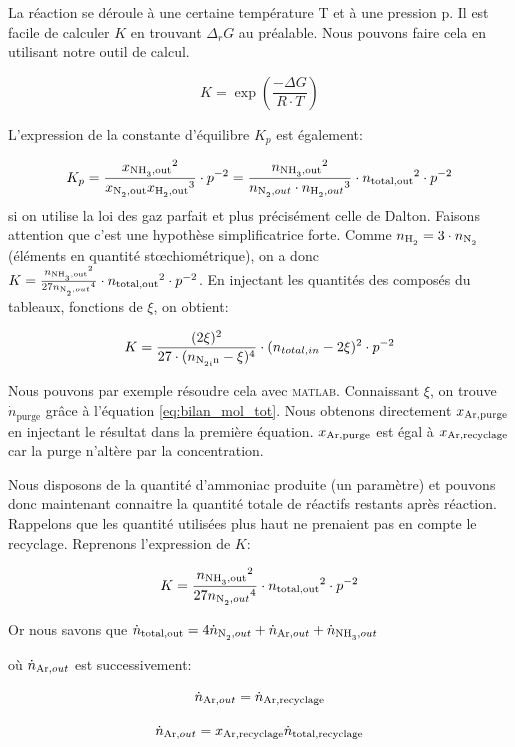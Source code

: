 \documentclass[a4paper, oneside, 12pt]{article}
\begin{document}
La réaction se déroule à une certaine température T et à une pression p. 
Il est facile de calculer $K$ en trouvant $\Delta_r G$ au préalable. 
Nous pouvons faire cela en utilisant notre outil de calcul.

\[
K=\exp{\left(\frac{-\Delta G}{R \cdot T}\right)}\]

L'expression de la constante d'équilibre $K_p$ est également: 

\[
K_p=\frac{{x_{\ce{NH3},\text{out}}}^2}{x_{\ce{N2},\text{out}}{x_{\ce{H2},\text{out}}}^3} \cdot p^{-2} = 
\frac{{n_{\ce{NH3},\text{out}}}^2}{n_{\ce{N2},out}\cdot {n_{\ce{H2},out}}^3}\cdot {n_{\text{total,out}}}^2\cdot p^{-2}
\]
si on utilise la loi des gaz parfait et plus précisément celle de Dalton. Faisons attention que c'est une hypothèse simplificatrice forte. 
Comme $n_{\ce{H2}}=3\cdot n_{\ce{N2}}$ (éléments en quantité stœchiométrique), 
on a donc 
$K=\frac{{n_{\ce{NH3},\text{out}}}^2}{27{n_{\ce{N2},out}}^4} \cdot
{n_{\text{total,out}}}^2\cdot p^{-2}$. 
En injectant les quantités des composés du tableaux, fonctions de $\xi$, on obtient:

\[ 
K = 
\frac{({2\xi})^2}{27 \cdot ({{n_{\ce{N2,in}}-\xi})^4}} \cdot
({n_{total,in}-2\xi})^2 \cdot p^{-2} 
\]

Nous pouvons par exemple résoudre cela avec \textsc{matlab}. 
Connaissant $\xi$, on trouve $\dot{n}_{\text{purge}}$
grâce à l'équation \ref{eq:bilan_mol_tot}. 
Nous obtenons directement $x_{\ce{Ar},\text{purge}}$ en injectant 
le résultat dans la première équation. 
$x_{\ce{Ar},\text{purge}}$ est égal à $x_{\ce{Ar},\text{recyclage}}$ 
car la purge n'altère par la concentration.

Nous disposons de la quantité d'ammoniac produite (un paramètre) 
et pouvons donc maintenant connaitre la quantité totale de réactifs restants après réaction. 
Rappelons que les quantité utilisées plus haut ne prenaient pas en compte le recyclage. 
Reprenons l'expression de $K$: 

\[ 
K = 
\frac{{n_{\ce{NH3},\text{out}}}^2}{27{n_{\ce{N2},out}}^4} \cdot 
{n_{\text{total,out}}}^2\cdot p^{-2}
\]

Or nous savons que $\dot{n}_{\text{total,out}} = 
4\dot{n}_{\ce{N2},out}+\dot{n}_{\ce{Ar},out}+\dot{n}_{\ce{NH3},out}$ 

où $\dot{n}_{\ce{Ar},out}$ est successivement:

\[\dot{n}_{\ce{Ar},out}=\dot{n}_{\ce{Ar},\text{recyclage}}\]

\[ \dot{n}_{\ce{Ar},out}=x_{\ce{Ar},\text{recyclage}}\dot{n}_{\text{total,recyclage}} \]
\end{document}
